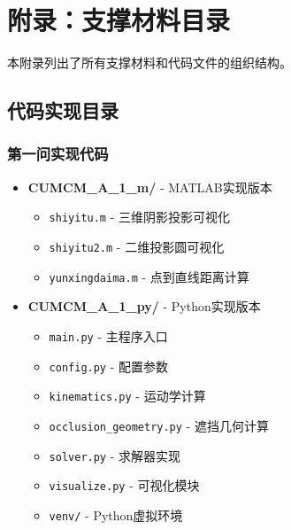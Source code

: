 \section{附录：支撑材料目录}

本附录列出了所有支撑材料和代码文件的组织结构。

\subsection{代码实现目录}

\subsubsection{第一问实现代码}
\begin{itemize}
    \item \textbf{CUMCM\_A\_1\_m/} - MATLAB实现版本
    \begin{itemize}
        \item \texttt{shiyitu.m} - 三维阴影投影可视化
        \item \texttt{shiyitu2.m} - 二维投影圆可视化
        \item \texttt{yunxingdaima.m} - 点到直线距离计算
    \end{itemize}
    \item \textbf{CUMCM\_A\_1\_py/} - Python实现版本
    \begin{itemize}
        \item \texttt{main.py} - 主程序入口
        \item \texttt{config.py} - 配置参数
        \item \texttt{kinematics.py} - 运动学计算
        \item \texttt{occlusion\_geometry.py} - 遮挡几何计算
        \item \texttt{solver.py} - 求解器实现
        \item \texttt{visualize.py} - 可视化模块
        \item \texttt{venv/} - Python虚拟环境
    \end{itemize}
\end{itemize}

